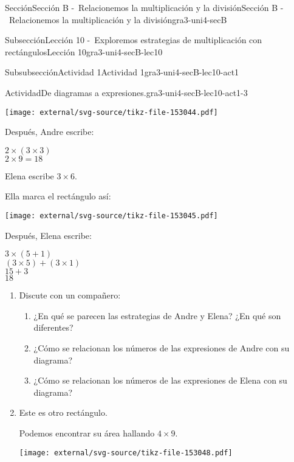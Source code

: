 \documentclass[twoside,10pt,]{article}
\begin{document}
\begin{sectionptx}{Sección}{Sección B -~Relacionemos la multiplicación y la división}{}{Sección B -~Relacionemos la multiplicación y la división}{}{}{gra3-uni4-secB}
\begin{subsectionptx}{Subsección}{Lección 10 -~Exploremos estrategias de multiplicación con rectángulos}{}{Lección 10}{}{}{gra3-uni4-secB-lec10}
\begin{subsubsectionptx}{Subsubsección}{Actividad 1}{}{Actividad 1}{}{}{gra3-uni4-secB-lec10-act1}
\begin{activity}{Actividad}{De diagramas a expresiones.}{gra3-uni4-secB-lec10-act1-3}
\begin{sidebyside}{3}{0}{0}{0.065}
\begin{sbspanel}{0.35}
\texttt{[image: external/svg-source/tikz-file-153044.pdf]}
\end{sbspanel}%
\begin{sbspanel}{0.25}%
Después, Andre escribe:%
\par
\(2 \times (3 \times 3)\)\\
 \(2 \times 9 = 18\)%
\end{sbspanel}%
\end{sidebyside}%
\begin{sidebyside}{3}{0}{0}{0.065}%
\begin{sbspanel}{0.27}%
Elena escribe \(3\times 6\).%
\end{sbspanel}%
\begin{sbspanel}{0.35}%
Ella marca el rectángulo así:%
\par
\texttt{[image: external/svg-source/tikz-file-153045.pdf]}
\end{sbspanel}%
\begin{sbspanel}{0.25}%
Después, Elena escribe:%
\par
\(3 \times (5 + 1)\)\\
 \((3 \times 5) + (3 \times 1)\)\\
 \(15+3\)\\
 \(18\)%
\end{sbspanel}%
\end{sidebyside}%
%
\begin{enumerate}
\item{}Discute con un compañero:%
%
\begin{enumerate}
\item{}¿En qué se parecen las estrategias de Andre y Elena? ¿En qué son diferentes?%
\item{}¿Cómo se relacionan los números de las expresiones de Andre con su diagrama?%
\item{}¿Cómo se relacionan los números de las expresiones de Elena con su diagrama?%
\end{enumerate}
\item{}\begin{sidebyside}{2}{0}{0}{0}%
\begin{sbspanel}{0.5}%
Este es otro rectángulo.%
\par
Podemos encontrar su área hallando \(4 \times 9\).%
\end{sbspanel}%
\begin{sbspanel}{0.5}%
\texttt{[image: external/svg-source/tikz-file-153048.pdf]}
\end{sbspanel}%
\end{sidebyside}%

\end{enumerate}
\end{activity}
\end{subsubsectionptx}
\end{subsectionptx}
\end{sectionptx}
\end{document}

